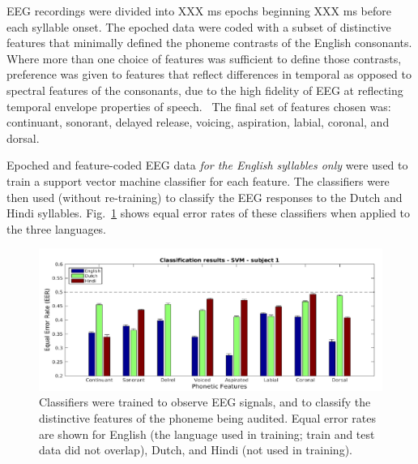 EEG recordings were divided into XXX ms epochs beginning XXX ms before
each syllable onset.
The epoched data were coded with a subset of distinctive features
that minimally defined the phoneme contrasts of the English consonants.
Where more than one choice of features was sufficient to define those
contrasts, preference was given to features that reflect differences
in temporal as opposed to spectral features of the consonants, due to
the high fidelity of EEG at reflecting temporal envelope properties of 
speech.~\cite{Liberto15} The final set of features chosen was:
continuant, sonorant, delayed release, voicing, aspiration, labial,
coronal, and dorsal.

Epoched and feature-coded EEG data {\em for the English syllables only}
were used to train a support vector machine classifier for each feature.
The classifiers were then used (without re-training) to classify the
EEG responses to the Dutch and Hindi syllables.
Fig.~\ref{fig:eeg_svm_eers} shows equal error rates of these
classifiers when applied to the three languages.

\begin{figure}
  \centerline{\includegraphics[width=5in]{../figs/diliberto_svmresults.png}}
  \caption{Classifiers were trained to observe EEG signals, and to
    classify the distinctive features of the phoneme being audited.
    Equal error rates are shown for English (the language used in
    training; train and test data did not overlap), Dutch, and Hindi
    (not used in training).}
  \label{fig:eeg_svm_eers}
\end{figure}

